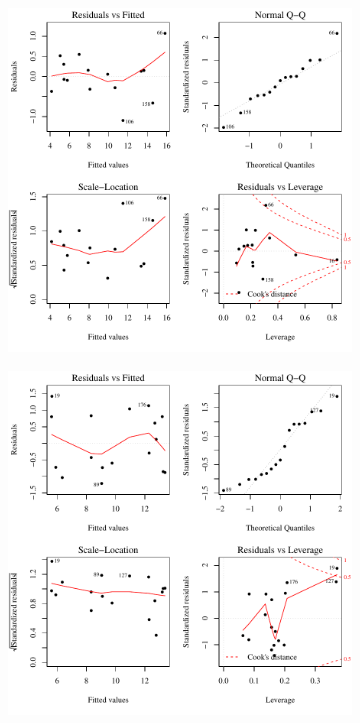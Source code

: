 \subfiguretop
\begin{landscape}
	\begin{figure}
		\begin{subfigure}{0.7\textwidth}
			\centering
			\includegraphics[width=\tableCustomSize]{"Figures/Results_USR/Stochastic/Conc Model lm-fit U163"}
		\end{subfigure}%
		\begin{subfigure}{0.7\textwidth}
			\centering
			\includegraphics[width=\tableCustomSize]{"Figures/Results_USR/Stochastic/Conc Model lm-fit U201"}

\end{subfigure}
\end{figure}
\end{landscape}
